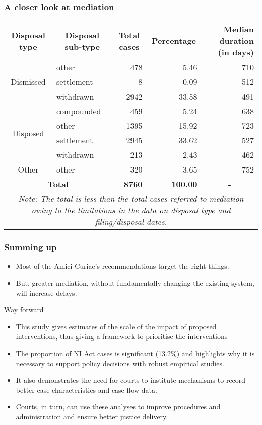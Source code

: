 \documentclass[10pt,aspectratio=169]{beamer}
\begin{document}
\begin{frame}
  \frametitle{A closer look at mediation}
  \footnotesize
  \begin{longtable}{clrrr}
    \toprule
    \textbf{Disposal type} & \multicolumn{1}{c}{\textbf{Disposal sub-type}} & \multicolumn{1}{c}{\textbf{Total cases}} & \multicolumn{1}{c}{\textbf{Percentage}} & \multicolumn{1}{p{3cm}}{\textbf{Median duration (in days)}} \\
    \midrule %
    \multirow{3}{*}{Dismissed} & other & 478 & 5.46 & 710 \\
                           & settlement & 8 & 0.09 & 512 \\
                           & withdrawn & 2942 & 33.58 & 491 \\
    \midrule
\multirow{4}{*}{Disposed} & compounded & 459 & 5.24 & 638 \\
                           & other & 1395 & 15.92 & 723 \\
                           & settlement & 2945 & 33.62 & 527 \\
                           & withdrawn & 213 & 2.43 & 462 \\
    \midrule
    Other & other & 320 & 3.65 & 752 \\
    \midrule
    \multicolumn{2}{c}{\textbf{Total}} & \textbf{8760} & \textbf{100.00} & \multicolumn{1}{c}{\textbf{-}} \\
    \bottomrule \multicolumn{5}{p{11cm}}{\footnotesize \emph{Note:
    The total is less than the total cases referred to mediation owing to the limitations in the data on disposal type and filing/disposal dates.}}
  \end{longtable}
\end{frame}

\begin{frame}
  \frametitle{Summing up}
  \begin{itemize}
  \item Most of the Amici Curiae's recommendations target the right things.
  \item But, greater mediation, without fundamentally changing the existing system, will increase delays.
  \end{itemize}
\end{frame}

\begin{frame}{Way forward}
 \begin{itemize}
 \item This study gives estimates of the scale of the impact of proposed interventions, thus giving a framework to prioritise the interventions
 \item The proportion of NI Act cases is significant (13.2\%) and highlights why it is necessary to support policy decisions with robust empirical studies.
 \item It also demonstrates the need for courts to institute mechanisms to record better case characteristics and case flow data. 
 \item Courts, in turn, can use these analyses to improve procedures and administration and ensure better justice delivery.
 \end{itemize}
\end{frame}
\end{document}
